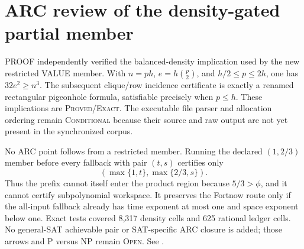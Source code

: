 \section{ARC review of the density-gated partial member}
PROOF independently verified the balanced-density implication used by the
new restricted VALUE member.  With $n=ph$, $e=h\binom p2$, and
$h/2\le p\le2h$, one has $32e^2\ge n^3$.  The subsequent clique/row
incidence certificate is exactly a renamed rectangular pigeonhole formula,
satisfiable precisely when $p\le h$.  These implications are
\textsc{Proved/Exact}.  The executable file parser and allocation ordering
remain \textsc{Conditional} because their source and raw output are not yet
present in the synchronized corpus.

No ARC point follows from a restricted member.  Running the declared
$(1,2/3)$ member before every fallback with pair $(t,s)$ certifies only
\[
 (\max\{1,t\},\max\{2/3,s\}).
\]
Thus the prefix cannot itself enter the product region because
$5/3>\phi$, and it cannot certify subpolynomial workspace.  It preserves the
Fortnow route only if the all-input fallback already has time exponent at
most one and space exponent below one.  Exact tests covered 8,317 density
cells and 625 rational ledger cells.  No general-SAT achievable pair or
SAT-specific ARC closure is added; those arrows and P versus NP remain
\textsc{Open}.  See
.

